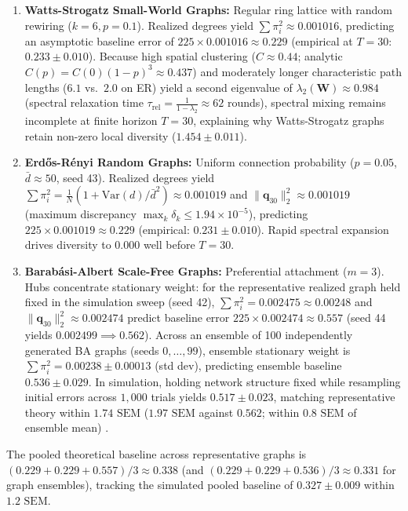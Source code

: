 \documentclass
[letterpaper]{article}
\begin{document}
\begin{enumerate}\setlength{\itemsep}{0pt}\setlength{\parskip}{0pt}\setlength{\parsep}{0pt}
    \item \textbf{Watts-Strogatz Small-World Graphs:} Regular ring lattice with random rewiring ($k=6, p=0.1$). Realized degrees yield $\sum \pi_i^2 \approx 0.001016$, predicting an asymptotic baseline error of $225 \times 0.001016 \approx 0.229$ (empirical at $T=30$: $0.233 \pm 0.010$). Because high spatial clustering ($C \approx 0.44$; analytic $C(p) = C(0)(1-p)^3 \approx 0.437$) and moderately longer characteristic path lengths ($6.1$ vs.\ $2.0$ on ER) yield a second eigenvalue of $\lambda_2(\mathbf{W}) \approx 0.984$ (spectral relaxation time $\tau_{\text{rel}} = \frac{1}{1 - \lambda_2} \approx 62$ rounds), spectral mixing remains incomplete at finite horizon $T=30$, explaining why Watts-Strogatz graphs retain non-zero local diversity ($1.454 \pm 0.011$).
    \item \textbf{Erd\H{o}s-R\'enyi Random Graphs:} Uniform connection probability ($p=0.05$, $\bar{d} \approx 50$, seed 43). Realized degrees yield $\sum \pi_i^2 = \frac{1}{N}(1 + \text{Var}(d)/\bar{d}^2) \approx 0.001019$ and $\|\mathbf{q}_{30}\|_2^2 \approx 0.001019$ (maximum discrepancy $\max_k \delta_k \le 1.94 \times 10^{-5}$), predicting $225 \times 0.001019 \approx 0.229$ (empirical: $0.231 \pm 0.010$). Rapid spectral expansion drives diversity to $0.000$ well before $T=30$.
    \item \textbf{Barab\'asi-Albert Scale-Free Graphs:} Preferential attachment ($m=3$). Hubs concentrate stationary weight: for the representative realized graph held fixed in the simulation sweep (seed 42), $\sum \pi_i^2 = 0.002475 \approx 0.00248$ and $\|\mathbf{q}_{30}\|_2^2 \approx 0.002474$ predict baseline error $225 \times 0.002474 \approx 0.557$ (seed 44 yields $0.002499 \implies 0.562$). Across an ensemble of 100 independently generated BA graphs (seeds $0, \dots, 99$), ensemble stationary weight is $\sum \pi_i^2 = 0.00238 \pm 0.00013$ (std dev), predicting ensemble baseline $0.536 \pm 0.029$. In simulation, holding network structure fixed while resampling initial errors across $1,000$ trials yields $0.517 \pm 0.023$, matching representative theory within $1.74\text{ SEM}$ ($1.97\text{ SEM}$ against $0.562$; within $0.8\text{ SEM}$ of ensemble mean) \citep{golub2010naive}.
\end{enumerate}
The pooled theoretical baseline across representative graphs is $(0.229 + 0.229 + 0.557)/3 \approx 0.338$ (and $(0.229 + 0.229 + 0.536)/3 \approx 0.331$ for graph ensembles), tracking the simulated pooled baseline of $0.327 \pm 0.009$ within $1.2\text{ SEM}$.
\end{document}
